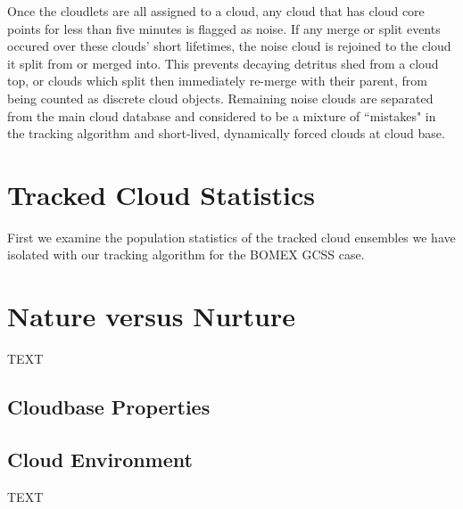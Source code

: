 \documentclass[acp]{copernicus}
\begin{document}
Once the cloudlets are all assigned to a cloud, any cloud that has cloud core 
points for less than five minutes is flagged as noise.  If any merge or split 
events occured over these clouds' short lifetimes, the noise cloud is rejoined 
to the cloud it split from or merged into.  This prevents decaying detritus shed 
from a cloud top, or clouds which split then immediately re-merge with their 
parent, from being counted as discrete cloud objects.  Remaining noise clouds 
are separated from the main cloud database and considered to be a mixture of 
``mistakes" in the tracking algorithm and short-lived, dynamically forced clouds 
at cloud base.



\section{Tracked Cloud Statistics}

First we examine the population statistics of the tracked cloud ensembles we 
have isolated with our tracking algorithm for the BOMEX GCSS case.



\section{Nature versus Nurture}
TEXT

\subsection{Cloudbase Properties}

\subsection{Cloud Environment}


\conclusions
TEXT


\end{document}
